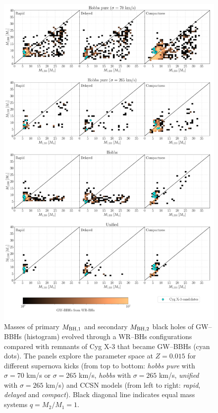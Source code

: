 \documentclass[a4paper,titlepage]{book}     	%
\begin{document}
\begin{appendices}
\begin{figure}
	\centering
	\includegraphics[width=\textwidth]{./images/kickcompare_MBHMBH_015.pdf}	
	\caption{Masses of primary $M_{\rm BH,1}$ and secondary $M_{\rm BH,2}$ black holes of GW--BBHs (histogram) evolved through a WR--BHs configurations compared with remnants of Cyg X-3 that became GW--BBHs (cyan dots). The panels explore the parameter space at $Z=0.015$ for different supernova kicks (from top to bottom: \emph{hobbs pure} with $\sigma = 70$ km/s or $\sigma = 265$ km/s, \emph{hobbs} with $\sigma = 265$ km/s, \emph{unified} with $\sigma = 265$ km/s) and CCSN models (from left to right: \emph{rapid}, \emph{delayed} and \emph{compact}). Black diagonal line indicates equal mass systems $q=M_2/M_1 = 1$.}\label{fig:resultsCygX3remBHBHGWBBHs}
\end{figure}


\end{appendices}
\end{document}

